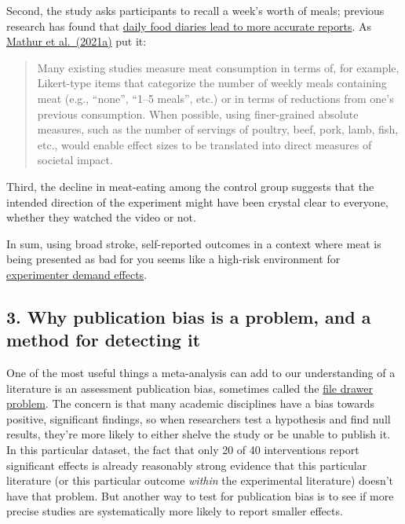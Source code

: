 \documentclass[
  letterpaper,
  DIV=11,
  numbers=noendperiod]{scrartcl}
\begin{document}
Second, the study asks participants to recall a week's worth of meals;
previous research has found that
\href{https://pubmed.ncbi.nlm.nih.gov/7635601/}{daily food diaries lead
to more accurate reports}. As
\href{https://www.sciencedirect.com/science/article/pii/S0195666321001847}{Mathur
et al.~(2021a)} put it:

\begin{quote}
Many existing studies measure meat consumption in terms of, for example,
Likert-type items that categorize the number of weekly meals containing
meat (e.g., ``none'', ``1--5 meals'', etc.) or in terms of reductions
from one's previous consumption. When possible, using finer-grained
absolute measures, such as the number of servings of poultry, beef,
pork, lamb, fish, etc., would enable effect sizes to be translated into
direct measures of societal impact.
\end{quote}

Third, the decline in meat-eating among the control group suggests that
the intended direction of the experiment might have been crystal clear
to everyone, whether they watched the video or not.

In sum, using broad stroke, self-reported outcomes in a context where
meat is being presented as bad for you seems like a high-risk
environment for
\href{https://www.elgaronline.com/display/edcoll/9781788110556/9781788110556.00031.xml}{experimenter
demand effects}.

\subsection{3. Why publication bias is a problem, and a method for
detecting
it}\label{why-publication-bias-is-a-problem-and-a-method-for-detecting-it}

One of the most useful things a meta-analysis can add to our
understanding of a literature is an assessment publication bias,
sometimes called the
\href{https://psycnet.apa.org/record/1979-27602-001}{file drawer
problem}. The concern is that many academic disciplines have a bias
towards positive, significant findings, so when researchers test a
hypothesis and find null results, they're more likely to either shelve
the study or be unable to publish it. In this particular dataset, the
fact that only 20 of 40 interventions report significant effects is
already reasonably strong evidence that this particular literature (or
this particular outcome \emph{within} the experimental literature)
doesn't have that problem. But another way to test for publication bias
is to see if more precise studies are systematically more likely to
report smaller effects.
\end{document}
